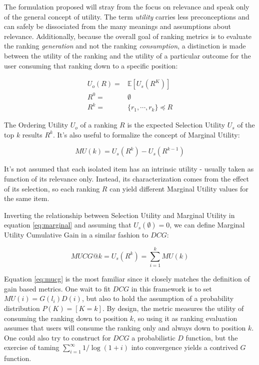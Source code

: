 \documentclass[a4paper, 10pt, conference]{ieeeconf}
\begin{document}
The formulation proposed will stray from the focus on relevance and speak only
of the general concept of utility. The term \textit{utility} carries less
preconceptions and can safely be dissociated from the many meanings and
assumptions about relevance. Additionally, because the overall goal of ranking
metrics is to evaluate the ranking \textit{generation} and not the ranking
\textit{consumption}, a distinction is made between the utility of the ranking
and the utility of a particular outcome for the user consuming that ranking down
to a specific position:

\begin{equation}
\label{eq:framework}
\begin{aligned}
U_o(R) =& \mathbb{E}\left[ U_s(R^K) \right]\\
R^0 =& \emptyset\\
R^k =& \{r_1, \cdots, r_k \} \preceq R
\end{aligned}
\end{equation}

The Ordering Utility $U_o$ of a ranking $R$ is the expected Selection Utility
$U_s$ of the top $k$ results $R^k$. It's also useful to formalize the concept of
Marginal Utility:

\begin{equation}
\label{eq:marginal}
MU(k) = U_s(R^k) - U_s(R^{k-1})
\end{equation}

It's not assumed that each isolated item has an intrinsic utility - usually
taken as function of its relevance only. Instead, its characterization comes
from the effect of its selection, so each ranking $R$ can yield different
Marginal Utility values for the same item.

Inverting the relationship between Selection Utility and Marginal Utility in
equation \ref{eq:marginal} and assuming that $U_s(\emptyset) =0$, we can define
Marginal Utility Cumulative Gain in a similar fashion to $DCG$:

\begin{equation}
\label{eq:mucg}
MUCG@k = U_s(R^k) = \sum_{i=1}^k MU(k)
\end{equation}

Equation \ref{eq:mucg} is the most familiar since it closely matches the
definition of gain based metrics. One wait to fit $DCG$ in this framework is to
set $MU(i) = G(l_i)D(i)$, but also to hold the assumption of a probability
distribution $P(K) = [K=k]$. By design, the metric measures the utility of
consuming the ranking down to position $k$, so using it as  ranking evaluation
assumes that users will consume the ranking only and always down to position
$k$. One could also try to construct for $DCG$ a probabilistic $D$ function, but
the exercise of taming $\sum_{i=1}^\infty 1/\log(1+i)$ into convergence yields a
contrived $G$ function.
\end{document}
